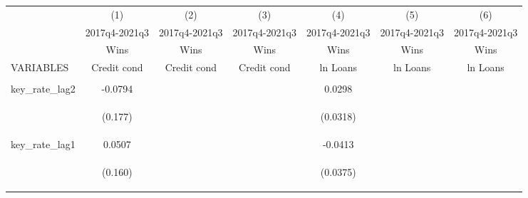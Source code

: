 \documentclass[]{article}
\begin{document}
\begin{center}
\begin{tabular}{lcccccc} \hline
 & (1) & (2) & (3) & (4) & (5) & (6) \\
 & 2017q4-2021q3 & 2017q4-2021q3 & 2017q4-2021q3 & 2017q4-2021q3 & 2017q4-2021q3 & 2017q4-2021q3 \\
 & Wins & Wins & Wins & Wins & Wins & Wins \\
VARIABLES & Credit cond & Credit cond & Credit cond & ln Loans & ln Loans & ln Loans \\ \hline
\vspace{4pt} & \begin{footnotesize}\end{footnotesize} & \begin{footnotesize}\end{footnotesize} & \begin{footnotesize}\end{footnotesize} & \begin{footnotesize}\end{footnotesize} & \begin{footnotesize}\end{footnotesize} & \begin{footnotesize}\end{footnotesize} \\
key\_rate\_lag2 & -0.0794 &  &  & 0.0298 &  &  \\
\vspace{4pt} & \begin{footnotesize}(0.177)\end{footnotesize} & \begin{footnotesize}\end{footnotesize} & \begin{footnotesize}\end{footnotesize} & \begin{footnotesize}(0.0318)\end{footnotesize} & \begin{footnotesize}\end{footnotesize} & \begin{footnotesize}\end{footnotesize} \\
key\_rate\_lag1 & 0.0507 &  &  & -0.0413 &  &  \\
\vspace{4pt} & \begin{footnotesize}(0.160)\end{footnotesize} & \begin{footnotesize}\end{footnotesize} & \begin{footnotesize}\end{footnotesize} & \begin{footnotesize}(0.0375)\end{footnotesize} & \begin{footnotesize}\end{footnotesize} & \begin{footnotesize}\end{footnotesize} \\

\end{tabular}
\end{center}
\end{document}
